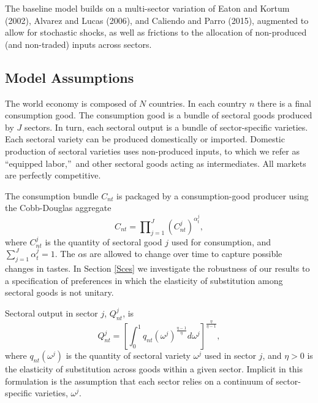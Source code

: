 \documentclass[12pt]{article}
\begin{document}
The baseline model builds on a multi-sector variation of Eaton and Kortum
(2002), Alvarez and Lucas (2006), and Caliendo and Parro (2015), augmented
to allow for stochastic shocks, as well as frictions to the allocation of
non-produced (and non-traded) inputs across sectors.

\subsection{Model Assumptions}

The world economy is composed of $N$ countries. In each country $n$ there is
a final consumption good. The consumption good is a bundle of sectoral goods
produced by $J$ sectors. In turn, each sectoral output is a bundle of
sector-specific varieties. Each sectoral variety can be produced
domestically or imported. Domestic production of sectoral varieties uses
non-produced inputs, to which we refer as \textquotedblleft equipped
labor,\textquotedblright\ and other sectoral goods acting as intermediates.
All markets are perfectly competitive.

The consumption bundle $C_{nt}$ is packaged by a consumption-good producer
using the Cobb-Douglas aggregate 
\begin{equation}
C_{nt}=\prod\nolimits_{j=1}^{J}\left( C_{nt}^{j}\right) ^{\alpha _{t}^{j}},
\label{aggregate}
\end{equation}%
where $C_{nt}^{j}$ is the quantity of sectoral good $j$ used for
consumption, and $\sum_{j=1}^{J}\alpha _{t}^{j}=1$. The $\alpha $s are
allowed to change over time to capture possible changes in tastes. 
In Section \ref{Sces} we investigate the robustness of our results to a
specification of preferences in which the elasticity of substitution among
sectoral goods is not unitary.

Sectoral output in sector $j$, $Q_{nt}^{j}$, is 
\begin{equation}
Q_{nt}^{j}=\left[ \int_{0}^{1}q_{nt}(\omega ^{j})^{\frac{\eta -1}{\eta }%
}d\omega ^{j}\right] ^{\frac{\eta }{\eta -1}},  \label{sectoroutput}
\end{equation}%
where $q_{nt}(\omega ^{j})$ is the quantity of sectoral variety $\omega ^{j}$
used in sector $j$, and $\eta >0$ is the elasticity of substitution across
goods within a given sector. Implicit in this formulation is the assumption
that each sector relies on a continuum of sector-specific varieties, $\omega
^{j}$.
\end{document}

